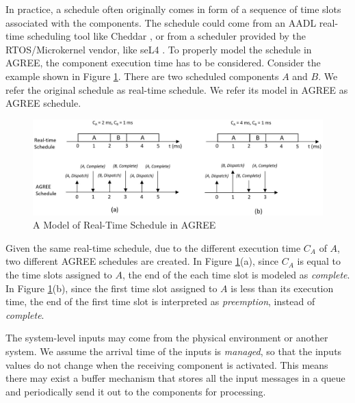 In practice, a schedule often originally comes in form of a sequence of time slots associated with the components. 
The schedule could come from an AADL real-time scheduling tool like Cheddar \cite{cheddar}, or from a scheduler provided by the RTOS/Microkernel vendor, like seL4 \cite{sel4}. 
To properly model the schedule in AGREE, the component execution time has to be considered. Consider the example shown in Figure \ref{RTschedule}. There are two scheduled components $A$ and $B$. We refer the original schedule as real-time schedule. We refer its model in AGREE as AGREE schedule.
\begin{figure}[ht!]
\centering
\includegraphics[width=130mm]{RTschedule.jpg}
\caption{A Model of Real-Time Schedule in AGREE\label{RTschedule}}
\end{figure}
Given the same real-time schedule, due to the different execution time $C_A$ of $A$, two different AGREE schedules are created. In Figure \ref{RTschedule}(a), since $C_A$ is equal to the time slots assigned to $A$, the end of the each time slot is modeled as \emph{complete}. In Figure \ref{RTschedule}(b), since the first time slot assigned to $A$ is less than its execution time, the end of the first time slot is interpreted as \emph{preemption}, instead of \emph{complete}.


The system-level inputs may come from the physical environment or another system. We assume the arrival time of the inputs is \emph{managed}, so that the inputs values do not change when the receiving component is activated. This means there may exist a buffer mechanism that stores all the input messages in a queue and periodically send it out to the components for processing. %

